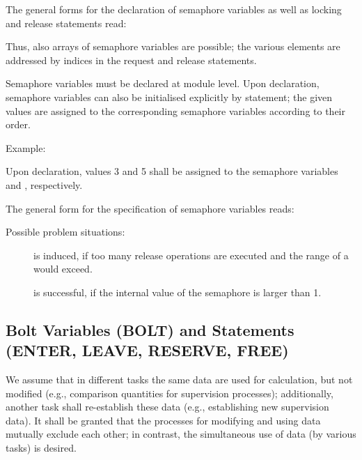The general forms for the declaration of semaphore variables as well as
locking and release statements read:

\begin{grammarframe}



\end{grammarframe}


Thus, also arrays of semaphore variables are possible; the various
elements are addressed by indices in the request and release
statements.

Semaphore variables must be declared at module level. Upon declaration,
semaphore variables can also be initialised explicitly by 
statement; the given values are assigned to the corresponding
semaphore variables according to their order.

Example:

Upon declaration, values 3 and 5 shall be assigned to the semaphore
variables  and , respectively.


The general form for the specification of semaphore variables reads:

\begin{grammarframe}

\end{grammarframe}

Possible problem situations:

\begin{description}
\item[] is induced, if too many release operations
   are executed and the range of a  would exceed.
\item[ ] is successful, if the internal value of the 
   semaphore is larger than 1.

\end{description}

\subsection{Bolt Variables (BOLT) and Statements (ENTER, LEAVE,
RESERVE, FREE)} %
\label{sec_bolt}

We assume that in different tasks the same data are used for
calculation, but not modified (e.g., comparison quantities for
supervision processes); additionally, another task shall re-establish
these data (e.g., establishing new supervision data). It shall be
granted that the processes for modifying and using data mutually exclude
each other; in contrast, the simultaneous use of data (by various tasks)
is desired.

